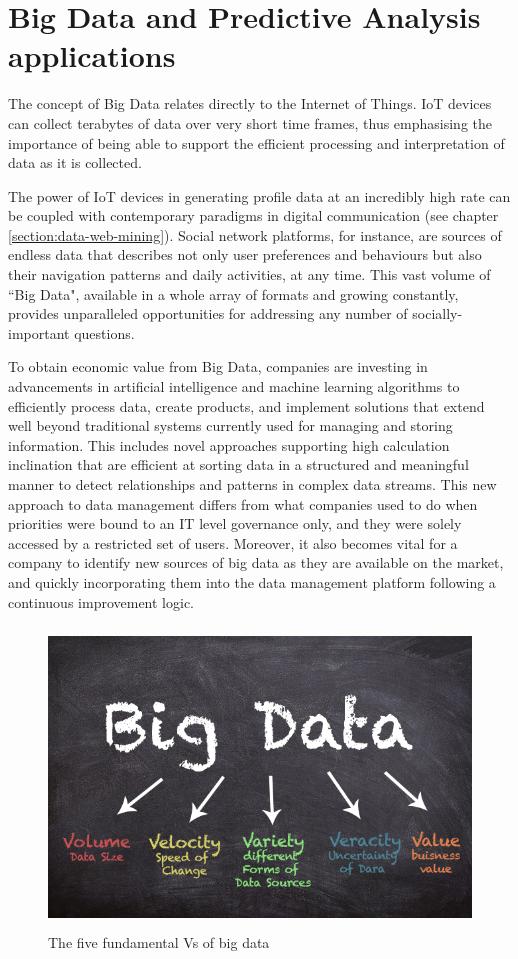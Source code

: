 \section{Big Data and Predictive Analysis applications}

The concept of Big Data relates directly to the Internet of Things. IoT devices can collect terabytes of data over very short time frames, thus emphasising the importance of being able to support the efficient processing and interpretation of data as it is collected.

The power of IoT devices in generating profile data at an incredibly high rate can be coupled with contemporary paradigms in digital communication (see chapter \ref{section:data-web-mining}). Social network platforms, for instance, are sources of endless data that describes not only user preferences and behaviours but also their navigation patterns and daily activities, at any time. This vast volume of ``Big Data", available in a whole array of formats and growing constantly, provides unparalleled opportunities for addressing any number of socially-important questions.

To obtain economic value from Big Data, companies are investing in advancements in artificial intelligence and machine learning algorithms to efficiently process data, create products, and implement solutions that extend well beyond traditional systems currently used for managing and storing information. This includes novel approaches supporting high calculation inclination that are efficient at sorting data in a structured and meaningful manner to detect relationships and patterns in complex data streams. This new approach to data management differs from what companies used to do when priorities were bound to an IT level governance only, and they were solely accessed by a restricted set of users. Moreover, it also becomes vital for a company to identify new sources of big data as they are available on the market, and quickly incorporating them into the data management platform following a continuous improvement logic.

\vspace{0.5cm}
\begin{figure}[htbp]
  \centering
    \includegraphics[height=8cm]{images/bigdata.png}
  \caption{The five fundamental Vs of big data }
  \label{fig:bigdata}
\end{figure}
\vspace{0.5cm}

